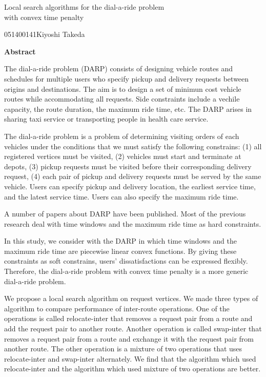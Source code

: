 

\newpage
\begin{center}{\LARGE Local  search algorithms for the dial-a-ride problem\\ with convex time penalty}\\[0.5cm]
\end{center}
\hfill {\large 051400141\qquad Kiyoshi Takeda}\\[0.5cm]
\begin{center}
{\large \bf Abstract}\\
\end{center}
The dial-a-ride problem (DARP) consists of designing vehicle routes and schedules for multiple users who specify pickup and delivery requests between origins and destinations. The aim is to design a set of minimun cost vehicle routes while accommodating all requests. Side constraints include a vechile capacity, the route duration, the maximum ride time, etc. The DARP arises in sharing taxi service or transporting people in health care service.

The dial-a-ride problem is a problem of determining visiting orders of each vehicles under the conditions that we must satisfy the following constrains: (1) all registered vertices must be visited, (2) vehicles must start and terminate at depots, (3) pickup requests must be visited before their corresponding delivery request, (4) each pair of pickup and delivery requests must be served by the same vehicle.  Users can specify pickup and delivery location, the earliest service time, and the latest service time. Users can also specify the maximum ride time.

A number of papers about DARP have been published. Most of the previous research deal with time windows and the maximum ride time as hard constraints.

In this study, we consider with the DARP in which time windows and the maximum ride time are piecewise linear convex functions. By giving these constraints as soft constrains, users' dissatisfactions can be expressed flexibly. Therefore, the dial-a-ride problem with convex time penalty is a more generic dial-a-ride problem.

We propose a local search algorithm on request vertices. We made three types of algorithm to compare performance of inter-route operations.
One of the operations is called relocate-inter that removes a request pair from a route and add the request pair to another route. Another operation is called swap-inter that removes a request pair from a route and exchange it with the request pair from another route. The other operation is a mixture of two operations that uses relocate-inter and swap-inter alternately.
We find that the algorithm which used relocate-inter and the algorithm which used mixture of two operations are better.

